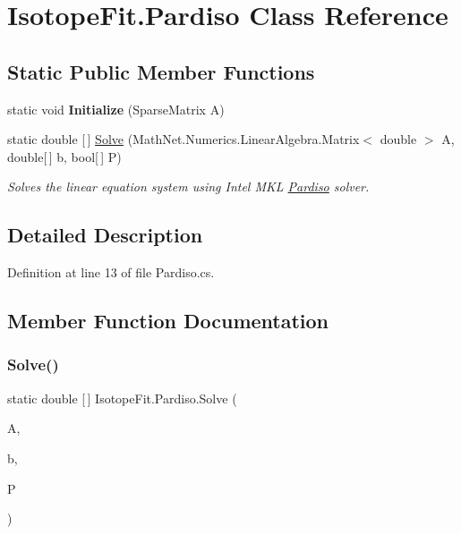 \hypertarget{class_isotope_fit_1_1_pardiso}{}\section{Isotope\+Fit.\+Pardiso Class Reference}
\label{class_isotope_fit_1_1_pardiso}
\subsection*{Static Public Member Functions}
\begin{DoxyCompactItemize}
\item 
\mbox{\label{class_isotope_fit_1_1_pardiso_aee93b0dd1d88f091eab140f424be6702}} 
static void {\bfseries Initialize} (Sparse\+Matrix A)
\item 
static double \mbox{[}$\,$\mbox{]} \hyperlink{class_isotope_fit_1_1_pardiso_af6dfb5879bc9ff922a9af4a0341e4c52}{Solve} (Math\+Net.\+Numerics.\+Linear\+Algebra.\+Matrix$<$ double $>$ A, double\mbox{[}$\,$\mbox{]} b, bool\mbox{[}$\,$\mbox{]} P)
\begin{DoxyCompactList}\small\item\em Solves the linear equation system using Intel M\+KL \hyperlink{class_isotope_fit_1_1_pardiso}{Pardiso} solver. \end{DoxyCompactList}\end{DoxyCompactItemize}


\subsection{Detailed Description}


Definition at line 13 of file Pardiso.\+cs.



\subsection{Member Function Documentation}
\mbox{\label{class_isotope_fit_1_1_pardiso_af6dfb5879bc9ff922a9af4a0341e4c52}} 
\subsubsection{\texorpdfstring{Solve()}{Solve()}}
{\footnotesize\ttfamily static double \mbox{[}$\,$\mbox{]} Isotope\+Fit.\+Pardiso.\+Solve (\begin{DoxyParamCaption}\item[{Math\+Net.\+Numerics.\+Linear\+Algebra.\+Matrix$<$ double $>$}]{A,  }\item[{double \mbox{[}$\,$\mbox{]}}]{b,  }\item[{bool \mbox{[}$\,$\mbox{]}}]{P }\end{DoxyParamCaption})\hspace{0.3cm}{\ttfamily [static]}}



